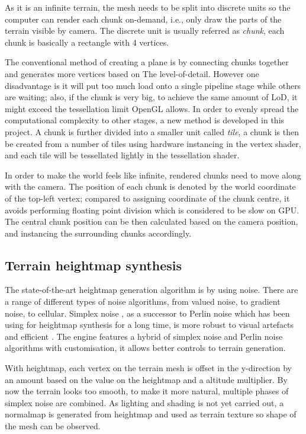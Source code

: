 \documentclass[oneside, a4paper]{article}
\begin{document}
    As it is an infinite terrain, the mesh needs to be split into discrete units so the computer can render each chunk on-demand, i.e., only draw the parts of the terrain visible by camera. The discrete unit is usually referred as \textit{chunk}, each chunk is basically a rectangle with 4 vertices.

    The conventional method of creating a plane is by connecting chunks together and generates more vertices based on The level-of-detail. However one disadvantage is it will put too much load onto a single pipeline stage while others are waiting; also, if the chunk is very big, to achieve the same amount of LoD, it might exceed the tessellation limit OpenGL allows. In order to evenly spread the computational complexity to other stages, a new method is developed in this project. A chunk is further divided into a smaller unit called \textit{tile}, a chunk is then be created from a number of tiles using hardware instancing in the vertex shader, and each tile will be tessellated lightly in the tessellation shader.

    In order to make the world feels like infinite, rendered chunks need to move along with the camera. The position of each chunk is denoted by the world coordinate of the top-left vertex; compared to assigning coordinate of the chunk centre, it avoids performing floating point division which is considered to be slow on GPU. The central chunk position can be then calculated based on the camera position, and instancing the surrounding chunks accordingly.

    \subsection{Terrain heightmap synthesis}

    The state-of-the-art heightmap generation algorithm is by using noise. There are a range of different types of noise algorithms, from valued noise, to gradient noise, to cellular. Simplex noise \cite{simplex_noise}, as a successor to Perlin noise \cite{perlin_noise} which has been using for heightmap synthesis for a long time, is more robust to visual artefacts and efficient \cite{improved_perlin}. The engine features a hybrid of simplex noise and Perlin noise \cite{simplex_demystified} algorithms with customisation, it allows better controls to terrain generation.

    With heightmap, each vertex on the terrain mesh is offset in the y-direction by an amount based on the value on the heightmap and a altitude multiplier. By now the terrain looks too smooth, to make it more natural, multiple phases of simplex noise are combined. As lighting and shading is not yet carried out, a normalmap is generated from heightmap and used as terrain texture so shape of the mesh can be observed.
\end{document}

